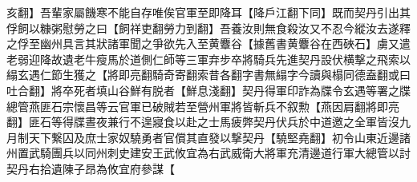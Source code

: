 亥翻】吾輩家屬饑寒不能自存唯俟官軍至即降耳【降戶江翻下同】既而契丹引出其俘飼以糠粥慰勞之曰【飼祥吏翻勞力到翻】吾養汝則無食殺汝又不忍今縱汝去遂釋之俘至幽州具言其狀諸軍聞之爭欲先入至黄麞谷【據舊書黄麞谷在西硤石】虜又遣老弱迎降故遺老牛瘦馬於道側仁師等三軍弃步卒將騎兵先進契丹設伏横撃之飛索以䌈玄遇仁節生獲之【將即亮翻騎奇寄翻索昔各翻字書無䌈字今讀與榻同德盍翻或曰吐合翻】將卒死者填山谷鮮有脱者【鮮息淺翻】契丹得軍印詐為牒令玄遇等署之牒總管燕匪石宗懷昌等云官軍已破賊若至營州軍將皆斬兵不叙勲【燕因肩翻將即亮翻】匪石等得牒晝夜兼行不遑寢食以赴之士馬疲弊契丹伏兵於中道邀之全軍皆沒九月制天下繋囚及庶士家奴驍勇者官償其直發以撃契丹【驍堅堯翻】初令山東近邊諸州置武騎團兵以同州刺史建安王武攸宜為右武威衛大將軍充清邊道行軍大總管以討契丹右拾遺陳子昂為攸宜府參謀【
